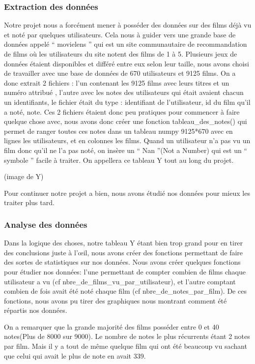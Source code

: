 \documentclass[a4paper,10pt]{article}
\begin{document}
\subsubsection{Extraction des données}
Notre projet nous a forcément mener à posséder des données sur des films déjà vu et noté par quelques utilisateurs. 
Cela nous à guider vers une grande base de données appelé `` movielens '' qui est un site communautaire de recommandation de films où les utilisateurs du site notent des films de 1 à 5. 
Plusieurs jeux de données étaient disponibles et différé entre eux selon leur taille, 
nous avons choisi de travailler avec une base de données de 670 utilisateurs et 9125 films. 
On a donc extrait 2 fichiers : l’un contenant les 9125 films avec leurs titres et un numéro attribué , 
l’autre avec les notes des utilisateurs qui était avaient chacun un identifiants, 
le fichier était du type : identifiant de l’utilisateur, id du film qu’il a noté, note.
Ces 2 fichiers étaient donc peu pratiques pour commencer à faire quelque chose avec, 
nous avons donc créer une fonction tableau\_des\_notes() qui permet de ranger toutes ces notes dans un tableau numpy 9125*670 avec en lignes les utilisateurs, 
et en colonnes les films. Quand un utilisateur n’a pas vu un film donc qu’il ne l’a pas noté, 
on insère un `` Nan ''(Not a Number) qui est un `` symbole '' facile à traiter. On appellera ce tableau Y tout au long du projet.


(image de Y)




Pour continuer notre projet a bien, nous avons étudié nos données pour mieux les traiter plus tard.
\subsubsection{Analyse des données}
Dans la logique des choses, notre tableau Y étant bien trop grand pour en tirer des conclusions 
juste à l’œil, nous avons créer des fonctions permettant de faire des sortes de statistiques sur nos données.
Nous avons créer quelques fonctions pour étudier nos données: l’une permettant de compter combien de films chaque utilisateur a vu (cf nbre\_de\_films\_vu\_par\_utilisateur), et l’autre comptant combien de fois avait été noté chaque film (cf nbre\_de\_notes\_par\_film). De ces fonctions, nous avons pu tirer des graphiques nous montrant comment été répartis nos données.


On a remarquer que la grande majorité des films posséder entre 0 et 40 notes(Plus de 8000 sur 9000). Le nombre de notes le plus récurrents étant 2 notes par film. Mais il y a tout de même quelque film qui ont été beaucoup vu sachant que celui qui avait le plus de note en avait 339.
\end{document}
